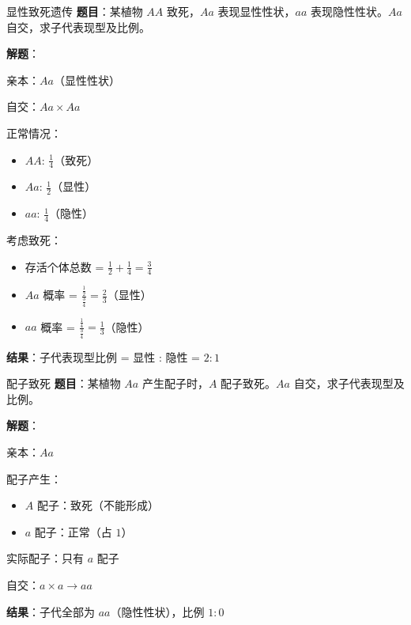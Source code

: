 \documentclass[a4paper,11pt]{ctexart}
\begin{document}
\begin{examplebox}{显性致死遗传}
\textbf{题目}：某植物 $AA$ 致死，$Aa$ 表现显性性状，$aa$ 表现隐性性状。$Aa$ 自交，求子代表现型及比例。

\textbf{解题}：

亲本：$Aa$（显性性状）

自交：$Aa \times Aa$

正常情况：
\begin{itemize}[leftmargin=2em]
    \item $AA$: $\frac{1}{4}$（致死）
    \item $Aa$: $\frac{1}{2}$（显性）
    \item $aa$: $\frac{1}{4}$（隐性）
\end{itemize}

考虑致死：
\begin{itemize}[leftmargin=2em]
    \item 存活个体总数 = $\frac{1}{2} + \frac{1}{4} = \frac{3}{4}$
    \item $Aa$ 概率 = $\frac{\frac{1}{2}}{\frac{3}{4}} = \frac{2}{3}$（显性）
    \item $aa$ 概率 = $\frac{\frac{1}{4}}{\frac{3}{4}} = \frac{1}{3}$（隐性）
\end{itemize}

\textbf{结果}：子代表现型比例 = 显性 : 隐性 = $2:1$
\end{examplebox}

\begin{examplebox}{配子致死}
\textbf{题目}：某植物 $Aa$ 产生配子时，$A$ 配子致死。$Aa$ 自交，求子代表现型及比例。

\textbf{解题}：

亲本：$Aa$

配子产生：
\begin{itemize}[leftmargin=2em]
    \item $A$ 配子：致死（不能形成）
    \item $a$ 配子：正常（占 $1$）
\end{itemize}

实际配子：只有 $a$ 配子

自交：$a \times a \to aa$

\textbf{结果}：子代全部为 $aa$（隐性性状），比例 $1:0$
\end{examplebox}
\end{document}

